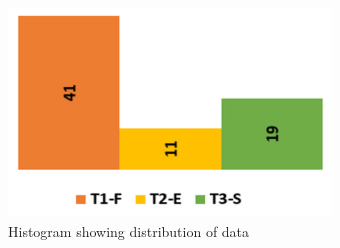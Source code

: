 \begin{figure}
    \centering
    \includegraphics[scale=0.4]{chapters/images/hist.png}
    \caption{Histogram showing distribution of data}
    \label{fig:hist}
\end{figure}





